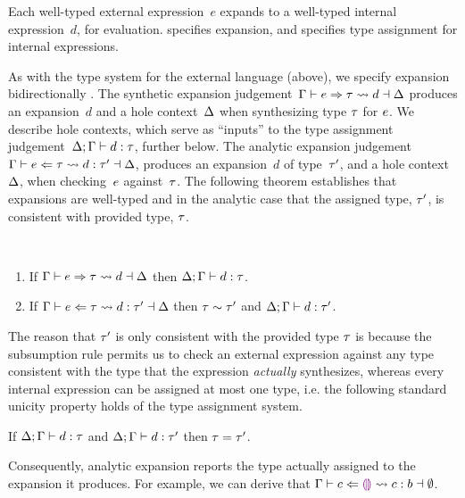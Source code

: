 


Each well-typed external expression~$e$ expands to a well-typed internal expression~$d$, for evaluation.
%
 specifies expansion, and  specifies type assignment for internal expressions.
%

As with the type system for the external language (above),
we specify expansion bidirectionally \cite{DBLP:conf/ppdp/FerreiraP14}.
%
The synthetic expansion judgement~$\Gamma \vdash e \Rightarrow \tau \leadsto d \dashv \Delta$
%
produces an expansion~$d$ and a hole context~$\Delta$ when synthesizing type $\tau$ for $e$.
%
We describe hole contexts, which serve as ``inputs'' to the type assignment judgement~$\Delta; \Gamma \vdash d : \tau$, further below.
%
The analytic expansion judgement~$\Gamma \vdash e \Leftarrow \tau \leadsto d : \tau' \dashv \Delta$, produces an expansion~$d$ of type~$\tau'$, and a hole context~$\Delta$, when checking~$e$ against~$\tau$.
%
The following theorem establishes that expansions are well-typed and in the analytic case that the assigned type, $\tau'$, is consistent with provided type, $\tau$.
%
\begin{thm}\label{thm:typed-expansion} ~
  \begin{enumerate}[nolistsep]
    \item
      If $\Gamma \vdash e \Rightarrow \tau \leadsto d \dashv \Delta$
      then $\Delta; \Gamma \vdash d : \tau$.
    \item
      If $\Gamma \vdash e \Leftarrow \tau \leadsto d : \tau' \dashv \Delta$
      then $\tau \sim \tau'$ and $\Delta; \Gamma \vdash d : \tau'$.
  \end{enumerate}
\end{thm}
\noindent
%
%
The reason that $\tau'$ is only consistent with the provided type $\tau$ is because
%
 the subsumption rule permits us
to check an external expression against any type consistent with the
type that the expression \emph{actually} synthesizes, whereas every internal
expression can be assigned at most one type, i.e. the following
standard unicity property holds of the type assignment system.
%
\begin{thm}
  If $\Delta; \Gamma \vdash d : \tau$
  and $\Delta; \Gamma \vdash d : \tau'$
  then $\tau=\tau'$.
\end{thm}
\noindent
Consequently, analytic expansion reports the type actually assigned to the expansion it produces.
%
For example, we can derive that $\Gamma \vdash c \Leftarrow \textcolor{violet}{\llparenthesis}\textcolor{violet}{\rrparenthesis} \leadsto c : b \dashv \emptyset$.%

